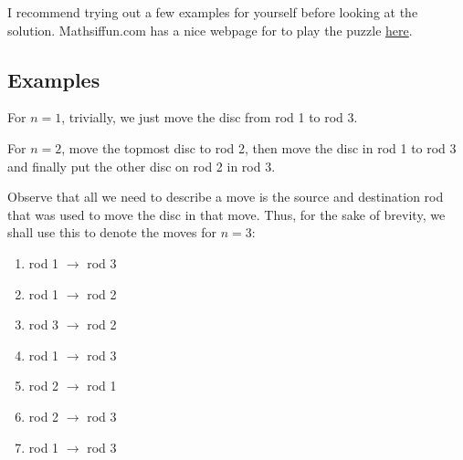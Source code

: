 \documentclass[12pt, a4paper]{article}
\theoremstyle{definition}
\theoremstyle{remark}
\begin{document}
I recommend trying out a few examples for yourself before looking at the solution. Mathsiffun.com has a nice webpage for to play the puzzle \href{https://www.mathsisfun.com/games/towerofhanoi.html}{here}.

\subsection{Examples}
For $n=1$, trivially, we just move the disc from rod 1 to rod 3.

For $n=2$, move the topmost disc to rod 2, then move the disc in rod 1 to rod 3 and finally put the other disc on rod 2 in rod 3.

Observe that all we need to describe a move is the source and destination rod that was used to move the disc in that move. Thus, for the sake of brevity, we shall use this to denote the moves for $n=3$:
\begin{enumerate}[noitemsep]
    \item rod 1 $\rightarrow$ rod 3
    \item rod 1 $\rightarrow$ rod 2
    \item rod 3 $\rightarrow$ rod 2
    \item rod 1 $\rightarrow$ rod 3
    \item rod 2 $\rightarrow$ rod 1
    \item rod 2 $\rightarrow$ rod 3
    \item rod 1 $\rightarrow$ rod 3
\end{enumerate}
\end{document}
